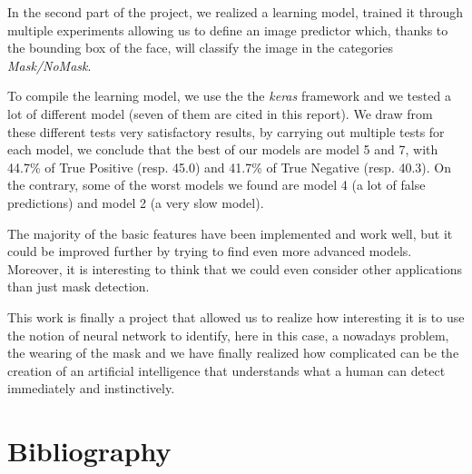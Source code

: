 \documentclass[a4paper,12pt]{article}
\begin{document}
In the second part of the project, we realized a learning model, trained it through multiple experiments allowing us to define an image predictor which, thanks to the bounding box of the face, will classify the image in the categories \textit{Mask/NoMask}.

To compile the learning model, we use the the \textit{keras} framework and we tested a lot of different model (seven of them are cited in this report). We draw from these different tests very satisfactory results, by carrying out multiple tests for each model, we conclude that the best of our models are model 5 and 7, with 44.7\% of True Positive (resp. 45.0) and 41.7\% of True Negative (resp. 40.3).
On the contrary, some of the worst models we found are model 4 (a lot of false predictions) and model 2 (a very slow model).

The majority of the basic features have been implemented and work well, but it could be improved further by trying to find even more advanced models. Moreover, it is interesting to think that we could even consider other applications than just mask detection.

This work is finally a project that allowed us to realize how interesting it is to use the notion of neural network to identify, here in this case, a nowadays problem, the wearing of the mask and we have finally realized how complicated can be the creation of an artificial intelligence that understands what a human can detect immediately and instinctively.

\section{Bibliography}
\printbibliography
\end{document}

